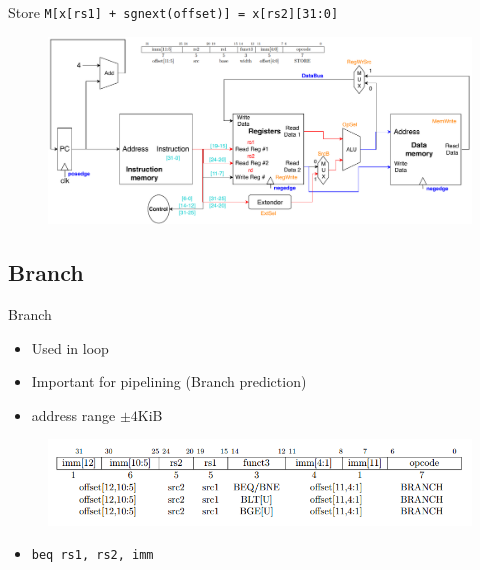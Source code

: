 \documentclass{myslide}
\begin{document}
\begin{frame}[fragile]{Store}
\verb'M[x[rs1] + sgnext(offset)] = x[rs2][31:0]'
\begin{figure}
\centering
\includegraphics[width=\linewidth]{fig/Lecture2/Datapath-sw.pdf}
\end{figure}
\end{frame}

\subsection{Branch}
\begin{frame}
\subsectionpage
\end{frame}

\begin{frame}[fragile]{Branch}
\begin{itemize}
	\item Used in loop
	\item Important for pipelining (Branch prediction)
	\item address range $\pm 4$KiB
\end{itemize}
\begin{figure}
\centering
\includegraphics[width=\linewidth]{fig/Lecture2/branch.PNG}
\end{figure}
\begin{itemize}
	\item \verb'beq rs1, rs2, imm'
\end{itemize}
\end{frame}
\end{document}
